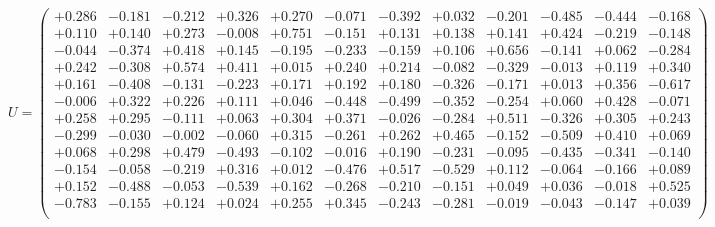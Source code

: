 \documentclass[9pt]{article}
\theoremstyle{plain}
\theoremstyle{definition}
\theoremstyle{remark}
\numberwithin{equation}{section}
\begin{document}
$U = \left(
\begin{array}{
cccccccccccc}
+0.286 & -0.181 & -0.212 & +0.326 & +0.270 & -0.071 & -0.392 & +0.032 & -0.201 & -0.485 & -0.444 & -0.168 \\
+0.110 & +0.140 & +0.273 & -0.008 & +0.751 & -0.151 & +0.131 & +0.138 & +0.141 & +0.424 & -0.219 & -0.148 \\
-0.044 & -0.374 & +0.418 & +0.145 & -0.195 & -0.233 & -0.159 & +0.106 & +0.656 & -0.141 & +0.062 & -0.284 \\
+0.242 & -0.308 & +0.574 & +0.411 & +0.015 & +0.240 & +0.214 & -0.082 & -0.329 & -0.013 & +0.119 & +0.340 \\
+0.161 & -0.408 & -0.131 & -0.223 & +0.171 & +0.192 & +0.180 & -0.326 & -0.171 & +0.013 & +0.356 & -0.617 \\
-0.006 & +0.322 & +0.226 & +0.111 & +0.046 & -0.448 & -0.499 & -0.352 & -0.254 & +0.060 & +0.428 & -0.071 \\
+0.258 & +0.295 & -0.111 & +0.063 & +0.304 & +0.371 & -0.026 & -0.284 & +0.511 & -0.326 & +0.305 & +0.243 \\
-0.299 & -0.030 & -0.002 & -0.060 & +0.315 & -0.261 & +0.262 & +0.465 & -0.152 & -0.509 & +0.410 & +0.069 \\
+0.068 & +0.298 & +0.479 & -0.493 & -0.102 & -0.016 & +0.190 & -0.231 & -0.095 & -0.435 & -0.341 & -0.140 \\
-0.154 & -0.058 & -0.219 & +0.316 & +0.012 & -0.476 & +0.517 & -0.529 & +0.112 & -0.064 & -0.166 & +0.089 \\
+0.152 & -0.488 & -0.053 & -0.539 & +0.162 & -0.268 & -0.210 & -0.151 & +0.049 & +0.036 & -0.018 & +0.525 \\
-0.783 & -0.155 & +0.124 & +0.024 & +0.255 & +0.345 & -0.243 & -0.281 & -0.019 & -0.043 & -0.147 & +0.039 \\
\end{array}
\right)$ \newline 
\end{document}
